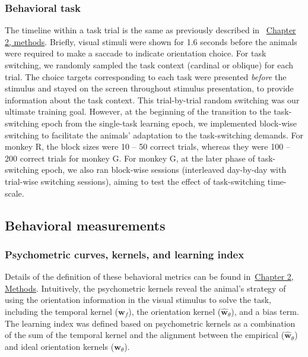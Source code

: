 \documentclass[lineno,pdflatex,sn-basic]{sn-jnl}%
\theoremstyle{thmstyleone}%
\theoremstyle{thmstyletwo}%
\theoremstyle{thmstylethree}%
\begin{document}
\subsubsection{Behavioral task} 
The timeline within a task trial is the same as previously described in ~\hyperref[sec_ch1:Exp_task]{Chapter 2, methods}. Briefly, visual stimuli were shown for 1.6 seconds before the animals were required to make a saccade to indicate orientation choice. For task switching, we randomly sampled the task context (cardinal or oblique) for each trial. The choice targets corresponding to each task were presented \emph{before} the stimulus and stayed on the screen throughout stimulus presentation, to provide information about the task context. This trial-by-trial random switching was our ultimate training goal. However, at the beginning of the transition to the task-switching epoch from the single-task learning epoch, we implemented block-wise switching to facilitate the animals’ adaptation to the task-switching demands. For monkey R, the block sizes were 10 -- 50 correct trials, whereas they were 100 -- 200 correct trials for monkey G. For monkey G, at the later phase of task-switching epoch, we also ran block-wise sessions (interleaved day-by-day with trial-wise switching sessions), aiming to test the effect of task-switching time-scale.





\subsection{Behavioral measurements}
\subsubsection{Psychometric curves, kernels, and learning index} 
Details of the definition of these behavioral metrics can be found in~\hyperref[sec_ch1:Behavioral measurements]{Chapter 2, Methods}. Intuitively, the psychometric kernels reveal the animal's strategy of using the orientation information in the visual stimulus to solve the task, including the temporal kernel ($\mathbf{w}_{f}$), the orientation kernel ($\mathbf{\hat{w}}_{\theta}$), and a bias term. The learning index was defined based on psychometric kernels as a combination of the sum of the temporal kernel and the alignment between the empirical ($\mathbf{\hat{w}}_{\theta}$) and ideal orientation kernels ($\mathbf{w}_{\theta}$).
\end{document}
